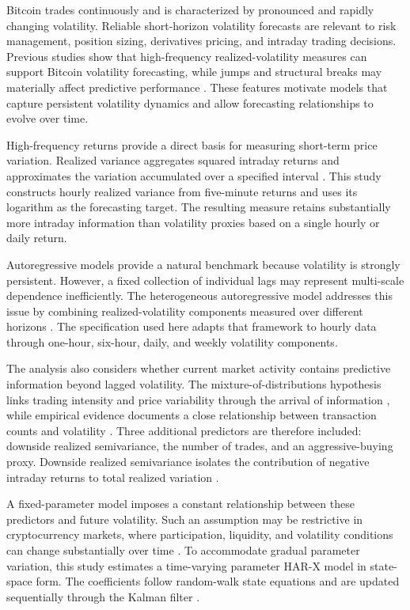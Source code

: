 Bitcoin trades continuously and is characterized by pronounced
and rapidly changing volatility. Reliable short-horizon
volatility forecasts are relevant to risk management, position
sizing, derivatives pricing, and intraday trading decisions.
Previous studies show that high-frequency realized-volatility
measures can support Bitcoin volatility forecasting, while
jumps and structural breaks may materially affect predictive
performance \citep{bergsli2022,shen2020}. These features
motivate models that capture persistent volatility dynamics
and allow forecasting relationships to evolve over time.

High-frequency returns provide a direct basis for measuring
short-term price variation. Realized variance aggregates
squared intraday returns and approximates the variation
accumulated over a specified interval \citep{andersen2003}.
This study constructs hourly realized variance from
five-minute returns and uses its logarithm as the forecasting
target. The resulting measure retains substantially more
intraday information than volatility proxies based on a single
hourly or daily return.

Autoregressive models provide a natural benchmark because
volatility is strongly persistent. However, a fixed collection
of individual lags may represent multi-scale dependence
inefficiently. The heterogeneous autoregressive model addresses
this issue by combining realized-volatility components measured
over different horizons \citep{corsi2009}. The specification
used here adapts that framework to hourly data through
one-hour, six-hour, daily, and weekly volatility components.

The analysis also considers whether current market activity
contains predictive information beyond lagged volatility. The
mixture-of-distributions hypothesis links trading intensity and
price variability through the arrival of information
\citep{clark1973}, while empirical evidence documents a close
relationship between transaction counts and volatility
\citep{jones1994}. Three additional predictors are therefore
included: downside realized semivariance, the number of trades,
and an aggressive-buying proxy. Downside realized
semivariance isolates the contribution of negative intraday
returns to total realized variation
\citep{barndorffnielsen2010}.

A fixed-parameter model imposes a constant relationship between
these predictors and future volatility. Such an assumption may
be restrictive in cryptocurrency markets, where participation,
liquidity, and volatility conditions can change substantially
over time \citep{shen2020}. To accommodate gradual parameter
variation, this study estimates a time-varying parameter HAR-X
model in state-space form. The coefficients follow random-walk
state equations and are updated sequentially through the
Kalman filter \citep{kalman1960,durbin2012}.


